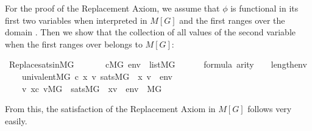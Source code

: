 For the proof of the Replacement Axiom, we assume that $\phi$ is
functional in its first two variables when interpreted in $M[G]$ and
the first ranges over the domain . Then we show that the collection of
all values of the second variable when the first ranges over
 belongs to $M[G]$:
%
\begin{isabelle}
\isamarkupfalse%
\ Replace{\isacharunderscore}sats{\isacharunderscore}in{\isacharunderscore}MG{\isacharcolon}\isanewline
\ \ \isanewline
\ \ \ \ {\isachardoublequoteopen}c{\isasymin}M{\isacharbrackleft}G{\isacharbrackright}{\isachardoublequoteclose}\ {\isachardoublequoteopen}env\ {\isasymin}\ list{\isacharparenleft}M{\isacharbrackleft}G{\isacharbrackright}{\isacharparenright}{\isachardoublequoteclose}\isanewline
\ \ \ \ {\isachardoublequoteopen}{\isasymphi}\ {\isasymin}\ formula{\isachardoublequoteclose}\ {\isachardoublequoteopen}arity{\isacharparenleft}{\isasymphi}{\isacharparenright}\ {\isasymle}\ {}\ {\isacharhash}{\isacharplus}\ length{\isacharparenleft}env{\isacharparenright}{\isachardoublequoteclose}\isanewline
\ \ \ \ {\isachardoublequoteopen}univalent{\isacharparenleft}{\isacharhash}{\isacharhash}M{\isacharbrackleft}G{\isacharbrackright}{\isacharcomma}\ c{\isacharcomma}\ {\isasymlambda}x\ v{\isachardot}\ sats{\isacharparenleft}M{\isacharbrackleft}G{\isacharbrackright}{\isacharcomma}\ {\isasymphi}{\isacharcomma}\ {\isacharbrackleft}x{\isacharcomma}\ v{\isacharbrackright}\ {\isacharat}\ env{\isacharparenright}{\isacharparenright}{\isachardoublequoteclose}\isanewline
\ \ \isanewline
\ \ \ \ {\isachardoublequoteopen}{\isacharbraceleft}v{\isachardot}\ x{\isasymin}c{\isacharcomma}\ v{\isasymin}M{\isacharbrackleft}G{\isacharbrackright}\ {\isasymand}\ sats{\isacharparenleft}M{\isacharbrackleft}G{\isacharbrackright}{\isacharcomma}\ {\isasymphi}{\isacharcomma}\ {\isacharbrackleft}x{\isacharcomma}v{\isacharbrackright}\ {\isacharat}\ env{\isacharparenright}{\isacharbraceright}\ {\isasymin}\ M{\isacharbrackleft}G{\isacharbrackright}{\isachardoublequoteclose}
\end{isabelle}
%
From this, the satisfaction of the Replacement Axiom in $M[G]$ follows
very easily.


